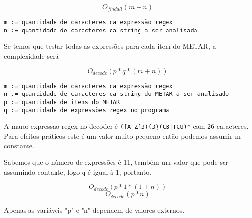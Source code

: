 $$ O_{findall}(m + n) $$

\begin{verbatim}
m := quantidade de caracteres da expressão regex
n := quantidade de caracteres da string a ser analisada
\end{verbatim}

Se temos que testar todas as expressões para cada item do METAR, a complexidade será

$$ O_{decode}(p * q * (m + n)) $$

\begin{verbatim}
m := quantidade de caracteres da expressão regex
n := quantidade de caracteres da string do METAR a ser analisado
p := quantidade de items do METAR
q := quantidade de expressões regex no programa
\end{verbatim}


A maior expressão regex no decoder é \texttt{([A-Z]{3})(\d{3})(CB|TCU)*} com 26 caracteres.
Para efeitos práticos este é um valor muito pequeno então podemos assumir m constante.

Sabemos que o número de expressões é 11, também um valor que pode ser assumindo contante, logo
q é igual à 1, portanto.

$$ O_{decode}(p * 1 * (1 + n)) $$
$$ O_{decode}(p * n) $$

Apenas as variáveis "p" e "n" dependem de valores externos. 
